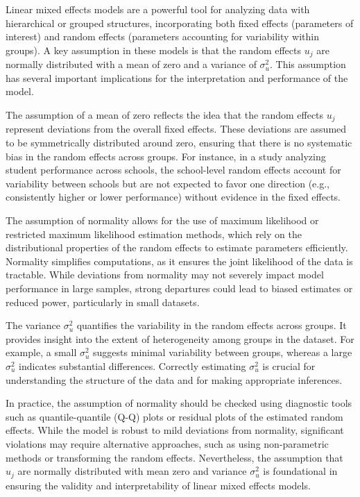 Linear mixed effects models are a powerful tool for analyzing data with hierarchical or grouped structures, incorporating both fixed effects (parameters of interest) and random effects (parameters accounting for variability within groups). A key assumption in these models is that the random effects $u_j$ are normally distributed with a mean of zero and a variance of $\sigma_u^2$. This assumption has several important implications for the interpretation and performance of the model.

The assumption of a mean of zero reflects the idea that the random effects $u_j$ represent deviations from the overall fixed effects. These deviations are assumed to be symmetrically distributed around zero, ensuring that there is no systematic bias in the random effects across groups. For instance, in a study analyzing student performance across schools, the school-level random effects account for variability between schools but are not expected to favor one direction (e.g., consistently higher or lower performance) without evidence in the fixed effects.

The assumption of normality allows for the use of maximum likelihood or restricted maximum likelihood estimation methods, which rely on the distributional properties of the random effects to estimate parameters efficiently. Normality simplifies computations, as it ensures the joint likelihood of the data is tractable. While deviations from normality may not severely impact model performance in large samples, strong departures could lead to biased estimates or reduced power, particularly in small datasets.

The variance $\sigma_u^2$ quantifies the variability in the random effects across groups. It provides insight into the extent of heterogeneity among groups in the dataset. For example, a small $\sigma_u^2$ suggests minimal variability between groups, whereas a large $\sigma_u^2$ indicates substantial differences. Correctly estimating $\sigma_u^2$ is crucial for understanding the structure of the data and for making appropriate inferences.

In practice, the assumption of normality should be checked using diagnostic tools such as quantile-quantile (Q-Q) plots or residual plots of the estimated random effects. While the model is robust to mild deviations from normality, significant violations may require alternative approaches, such as using non-parametric methods or transforming the random effects. Nevertheless, the assumption that $u_j$ are normally distributed with mean zero and variance $\sigma_u^2$ is foundational in ensuring the validity and interpretability of linear mixed effects models.

